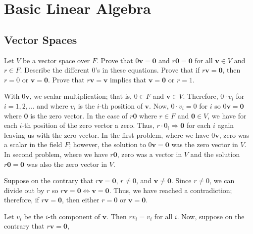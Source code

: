 \part{Basic Linear Algebra}

\chapter{Vector Spaces}

\begin{exercise}
\item
  Let \(V\) be a vector space over \(F\).
  Prove that \(0\mathbold{v} = \mathbold{0}\) and
  \(r\mathbold{0} = \mathbold{0}\) for all \(\mathbold{v}\in V\) and
  \(r\in F\).
  Describe the different \(0\)'s in these equations.
  Prove that if \(r\mathbold{v} = \mathbold{0}\), then \(r = 0\) or
  \(\mathbold{v} = \mathbold{0}\).
  Prove that \(r\mathbold{v} = \mathbold{v}\) implies that
  \(\mathbold{v} = \mathbold{0}\) or \(r = 1\).
  \par\smallskip
  With \(0\mathbold{v}\), we scalar multiplication; that is, \(0\in F\) and
  \(\mathbold{v}\in V\).
  Therefore, \(0\cdot v_i\) for \(i = 1,2,\ldots\) and where \(v_i\) is the
  \(i\)-th position of \(\mathbold{v}\).
  Now, \(0\cdot v_i = 0\) for \(i\) so \(0\mathbold{v}=\mathbold{0}\) where
  \(\mathbold{0}\) is the zero vector.
  In the case of \(r\mathbold{0}\) where \(r\in F\) and \(\mathbold{0}\in V\),
  we have for each \(i\)-th position of the zero vector a zero.
  Thus, \(r\cdot 0_i\Rightarrow\mathbold{0}\) for each \(i\) again leaving us
  with the zero vector.
  In the first problem, where we have \(0\mathbold{v}\), zero was a scalar in
  the field \(F\); however, the solution to \(0\mathbold{v} = \mathbold{0}\)
  was the zero vector in \(V\).
  In second problem, where we have \(r\mathbold{0}\), zero was a vector in \(V\) and the solution \(r\mathbold{0} = \mathbold{0}\) was also the zero
  vector in \(V\).
  \par\smallskip
  Suppose on the contrary that \(r\mathbold{v} = \mathbold{0}\), \(r\neq 0\),
  and \(\mathbold{v}\neq \mathbold{0}\).
  Since \(r\neq 0\), we can divide out by \(r\) so
  \(r\mathbold{v} = \mathbold{0}\iff \mathbold{v} = \mathbold{0}\).
  Thus, we have reached a contradiction; therefore, if
  \(r\mathbold{v} = \mathbold{0}\), then either \(r = 0\) or
  \(\mathbold{v} = \mathbold{0}\).
  \par\smallskip
  Let \(v_i\) be the \(i\)-th component of \(\mathbold{v}\).
  Then \(rv_i = v_i\) for all \(i\).
  Now, suppose on the contrary that \(r\mathbold{v} = \mathbold{0}\),

\end{exercise}

